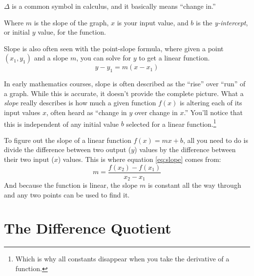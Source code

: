 \begin{remark}
  $\Delta$ is a common symbol in calculus, and it basically means ``change in.''
\end{remark}

Where $m$ is the slope of the graph, $x$ is your input value, and $b$ is the \emph{y-intercept}, or initial $y$ value, for the function.

Slope is also often seen with the point-slope formula, where given a point $(x_1, y_1)$ and a slope $m$, you can solve for $y$ to get a linear function.
\begin{equation}
  \label{eq:pointslope}
  y-y_1=m(x-x_1)
\end{equation}

In early mathematics courses, slope is often described as the ``rise'' over ``run'' of a graph.
While this is accurate, it doesn't provide the complete picture.
What a \emph{slope} really describes is how much a given function $f(x)$ is altering each of its input values $x$, often heard as ``change in $y$ over change in $x$.''
You'll notice that this is independent of any initial value $b$ selected for a linear function.\footnote{Which is why all constants disappear when you take the derivative of a function.}

To figure out the slope of a linear function $f(x)=mx+b$, all you need to do is
divide the difference between two output ($y$) values by the difference between
their two input ($x$) values. This is where equation \eqref{eq:slope} comes from:
\begin{equation*}
  m=\frac{f(x_2)-f(x_1)}{x_2-x_1}
\end{equation*}
And because the function is linear, the slope $m$ is constant all the way through and any two points can be used to find it.

\section{The Difference Quotient}

